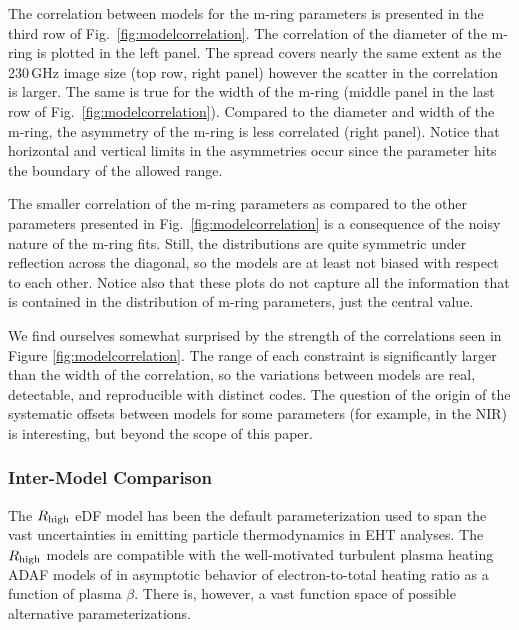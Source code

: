 The correlation between models for the m-ring parameters is presented in the third row of Fig.~\ref{fig:modelcorrelation}. The correlation of the diameter of the m-ring is plotted in the left panel. The spread covers nearly the same extent as the 230\,GHz image size (top row, right panel) however the scatter in the correlation is larger.  The same is true for the width of the m-ring (middle panel in the last row of Fig.~\ref{fig:modelcorrelation}). Compared to the diameter and width of the m-ring, the asymmetry of the m-ring is less correlated (right panel). Notice that horizontal and vertical limits in the asymmetries occur since the parameter hits the boundary of the allowed range.

The smaller correlation of the m-ring parameters as compared to the other parameters presented in Fig.~\ref{fig:modelcorrelation} is a consequence of the noisy nature of the m-ring fits.  Still, the distributions are quite symmetric under reflection across the diagonal, so the models are at least not biased with respect to each other.  Notice also that these plots do not capture all the information that is contained in the distribution of m-ring parameters, just the central value.   

We find ourselves somewhat surprised by the strength of the correlations seen in Figure \ref{fig:modelcorrelation}.  The range of each constraint is significantly larger than the width of the correlation, so the variations between models are real, detectable, and reproducible with distinct codes.  The question of the origin of the systematic offsets between models for some parameters (for example, in the NIR) is interesting, but beyond the scope of this paper.   

\subsubsection{Inter-Model Comparison}



The $R_\mathrm{high}$ eDF model has been the default parameterization used to span the vast uncertainties in emitting particle thermodynamics in EHT analyses. The $R_\mathrm{high}$ models  are compatible with the well-motivated turbulent plasma heating ADAF models of \cite{1999ApJ...520..248Q} in asymptotic behavior of electron-to-total heating ratio as a function of plasma $\beta$. There is, however, a vast function space of possible alternative parameterizations.

